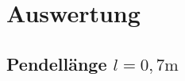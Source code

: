 \section{Auswertung}
\subsection{Pendellänge $l = 0,7 \si{\meter} $}
\begin{minipage}{\textwidth}

 \hfill

\end{minipage}


\begin{minipage}{\textwidth}

 \hfill

\end{minipage}










